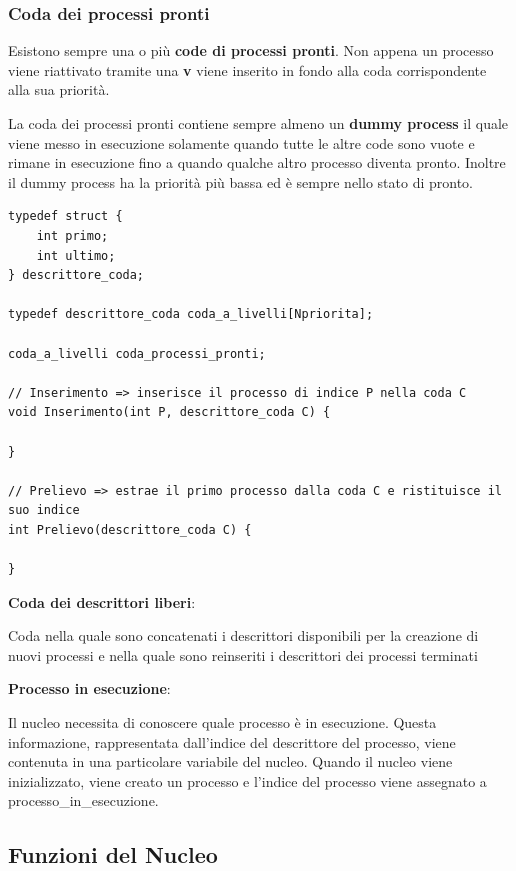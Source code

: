 \documentclass{article}
\begin{document}
\subsubsection{Coda dei processi pronti}

Esistono sempre una o più \textbf{code di processi pronti}. Non appena un processo viene riattivato tramite una \textbf{v} viene
inserito in fondo alla coda corrispondente alla sua priorità.

La coda dei processi pronti contiene sempre almeno un \textbf{dummy process} il quale viene messo in esecuzione solamente quando tutte
le altre code sono vuote e rimane in esecuzione fino a quando qualche altro processo diventa pronto. Inoltre il dummy process ha
la priorità più bassa ed è sempre nello stato di pronto.

\vspace{3mm}
\begin{lstlisting}[caption={Esempio di realizzazione coda dei processi pronti}]
typedef struct {
    int primo;
    int ultimo;
} descrittore_coda;

typedef descrittore_coda coda_a_livelli[Npriorita];

coda_a_livelli coda_processi_pronti;

// Inserimento => inserisce il processo di indice P nella coda C
void Inserimento(int P, descrittore_coda C) {

}

// Prelievo => estrae il primo processo dalla coda C e ristituisce il suo indice
int Prelievo(descrittore_coda C) {

}
\end{lstlisting}

\textbf{Coda dei descrittori liberi}:

Coda nella quale sono concatenati i descrittori disponibili per la creazione di nuovi processi
e nella quale sono reinseriti i descrittori dei processi terminati

\vspace{3mm}
\textbf{Processo in esecuzione}:

Il nucleo necessita di conoscere quale processo è in esecuzione. Questa informazione, rappresentata dall'indice del descrittore
del processo, viene contenuta in una particolare variabile del nucleo. Quando il nucleo viene inizializzato, viene creato un processo
e l'indice del processo viene assegnato a processo_in_esecuzione.

\subsection{Funzioni del Nucleo}
\end{document}
